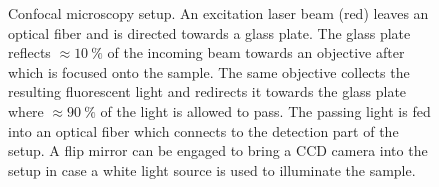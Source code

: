 		\begin{figure}[!htb]
			\centering
			\caption[Confocal microscopy setup]{Confocal microscopy setup. An excitation laser beam (red) leaves an optical fiber and is directed towards a glass plate. The glass plate reflects $\approx \SI{10}{\percent}$ of the incoming beam towards an objective after which is focused onto the sample. The same objective collects the resulting fluorescent light and redirects it towards the glass plate where $\approx \SI{90}{\percent}$ of the light is allowed to pass. The passing \fl light is fed into an optical fiber which connects to the detection part of the setup. A flip mirror can be engaged to bring a CCD camera into the setup in case a white light source is used to illuminate the sample.}
			\label{fig::confocal_setup}
		\end{figure}

